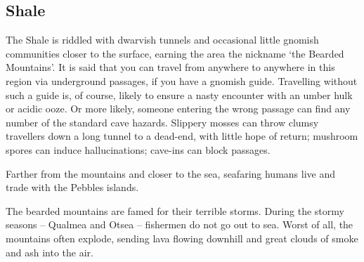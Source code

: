 \begin{multicols}{2}
\subsection{Shale}


The Shale is riddled with dwarvish tunnels and occasional little gnomish communities closer to the surface, earning the area the nickname `the Bearded Mountains'.
It is said that you can travel from anywhere to anywhere in this region via underground passages, if you have a gnomish guide.
Travelling without such a guide is, of course, likely to ensure a nasty encounter with an umber hulk or acidic ooze.
Or more likely, someone entering the wrong passage can find any number of the standard cave hazards.
Slippery mosses can throw clumsy travellers down a long tunnel to a dead-end, with little hope of return; mushroom spores can induce hallucinations; cave-ins can block passages.

Farther from the mountains and closer to the sea, seafaring humans live and trade with the Pebbles islands.

The bearded mountains are famed for their terrible storms.
During the stormy seasons -- Qualmea and Otsea -- fishermen do not go out to sea.
Worst of all, the mountains often explode, sending lava flowing downhill and great clouds of smoke and ash into the air.

\iftoggle{players}{
  \subsubsection{Spelunking}

  The Shale has three major terrains: the forests, the open plains (where humans mostly live), and the underground tunnels.
}{
  \subsubsection{Encounters}
  Shale's wide forests, flat planes, and long, deep, tunnels all bring equal chances of someone, or something, colliding with anyone wandering the land.

  \begin{nametable}{General Tempo Chart}
    \textbf{Roll} & \textbf{Result} \\\hline
    6 & Encounter, and reroll! \\
    5 & Encounter. \\
    4 & Encounter. \\
    3 & 1 day peace. \\
    2 & 3 days peace. \\
    1 & 3 days peace. \\
  \end{nametable}

}
\end{multicols}
